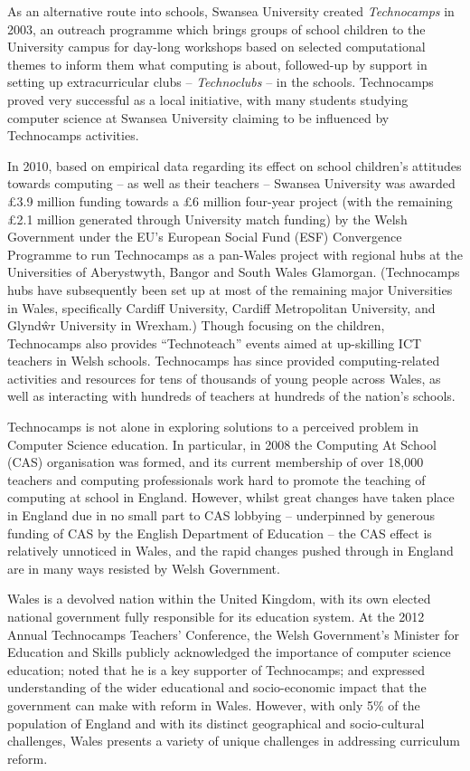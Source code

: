 \documentclass{sig-alternate}
\begin{document}
As an alternative route into schools, Swansea University created
\emph{Technocamps} in 2003, an outreach programme which brings groups
of school children to the University campus for day-long workshops based on
selected computational themes to inform them what computing is about,
followed-up by support in setting up
extracurricular clubs -- \emph{Technoclubs} -- in the schools.
Technocamps proved very successful as a local initiative, with many
students studying computer science at Swansea University claiming to be
influenced by Technocamps activities.

In 2010, based on empirical data
regarding its effect on school children's attitudes towards computing
-- as well as their teachers -- Swansea University was awarded
\pounds 3.9 million funding towards a \pounds 6 million four-year project
(with the remaining \pounds 2.1 million
generated through University match funding)
by the Welsh Government under the EU's European Social
Fund (ESF) Convergence Programme to run Technocamps as a pan-Wales
project with regional hubs at
the Universities of Aberystwyth, Bangor and
South Wales Glamorgan.
(Technocamps hubs have subsequently been set up at most of the remaining
major Universities in Wales, specifically Cardiff University,
Cardiff Metropolitan University, and Glynd\^wr University in Wrexham.)
Though focusing on the children, Technocamps also provides ``Technoteach''
events aimed at up-skilling ICT teachers in Welsh schools.
Technocamps has since provided computing-related activities and resources
for tens of thousands of young people across Wales, as well as interacting
with hundreds of teachers at hundreds of the nation's schools.

Technocamps is not alone in exploring solutions to a
perceived problem in Computer Science education.
In particular, in 2008 the
Computing At School (CAS) organisation was formed, and its current
membership of over 18,000 teachers and computing professionals
work hard to promote the teaching of computing at school in England.
However, whilst great changes have taken place in England
due in no small part to CAS lobbying
-- underpinned by generous funding of CAS by
the English Department of Education --
the CAS effect is relatively unnoticed in Wales,
and the rapid changes pushed through in England
are in many ways resisted by Welsh Government.

Wales is a devolved nation within the United Kingdom, with its own
elected national government fully responsible for its education system.
At the 2012 Annual Technocamps Teachers' Conference,
the Welsh Government's Minister for Education and Skills
publicly acknowledged the importance of computer science education;
noted that he is a key supporter of Technocamps;
and expressed understanding of the wider educational and
socio-economic impact that the government can make with reform in Wales.
However, with only 5\% of the population of England and with its distinct
geographical and socio-cultural challenges, Wales presents
a variety of unique challenges in addressing curriculum reform.
\end{document}
